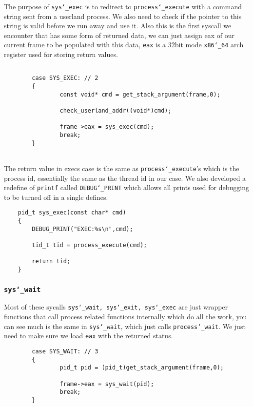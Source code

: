\documentclass[]{article}
\begin{document}
The purpose of \texttt{sys\char`_exec} is to redirect to \texttt{process\char`_execute} with a command string sent from a userland process. We also need to check if the pointer to this string is valid before we run away and use it. Also this is the first syscall we encounter that has some form of returned data, we can just assign eax of our current frame to be populated with this data, \texttt{eax} is a 32bit mode \texttt{x86\char`_64} arch register used for storing return values.
		\lstset{language=C, tabsize=2}  
		    \begin{lstlisting}   

		case SYS_EXEC: // 2
		{
				const void* cmd = get_stack_argument(frame,0);
			
				check_userland_addr((void*)cmd);
			
				frame->eax = sys_exec(cmd);
				break;
		}
	\end{lstlisting}    
	\texttt{}\\
	The return value in execs case is the same as \texttt{process\char`_execute}'s which is the process id, essentially the same as the thread id in our case. We also developed a redefine of \texttt{printf} called \texttt{DEBUG\char`_PRINT} which allows all prints used for debugging to be turned off in a single defines.
	
			\lstset{language=C, tabsize=2}  
		    \begin{lstlisting}   
	pid_t sys_exec(const char* cmd)
	{
		DEBUG_PRINT("EXEC:%s\n",cmd);
	
		tid_t tid = process_execute(cmd);
	
		return tid;
	}
	\end{lstlisting}    
  \newpage
  \subsubsection{\texttt{sys\char`_wait}}

	Most of these sycalls \texttt{sys\char`_wait, sys\char`_exit, sys\char`_exec} are just wrapper functions that call process related functions internally which do all the work, you can see much is the same in \texttt{sys\char`_wait}, which just calls \texttt{process\char`_wait}. We just need to make sure we load \texttt{eax} with the returned status.
	
	
			\lstset{language=C, tabsize=2}  
		    \begin{lstlisting}   
		case SYS_WAIT: // 3
		{
				pid_t pid = (pid_t)get_stack_argument(frame,0);
		
				frame->eax = sys_wait(pid);
				break;
		}
		   \end{lstlisting}	
  
\end{document}
